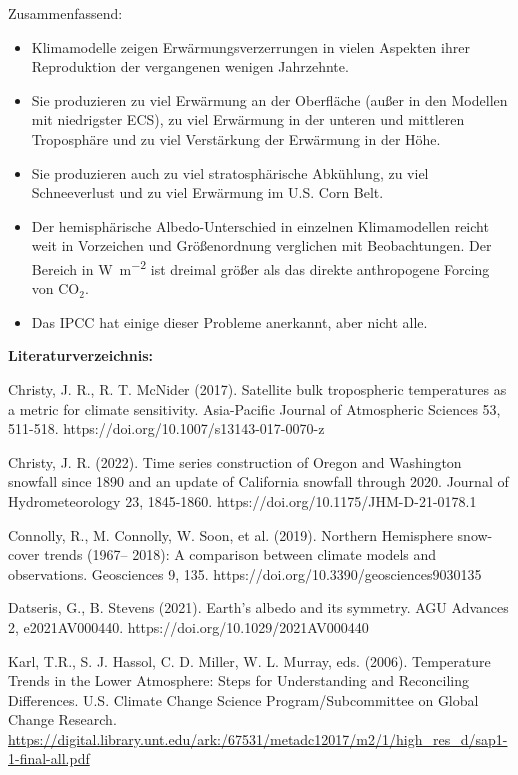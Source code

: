 \documentclass[12pt,paper=a4,DIV=12,parskip=never,chapterprefix=false,headings=standardclasses]{scrreprt}
\begin{document}
Zusammenfassend:
\begin{itemize}
\item Klimamodelle zeigen Erwärmungsverzerrungen in vielen Aspekten ihrer Reproduktion der vergangenen wenigen Jahrzehnte.
\item  Sie produzieren zu viel Erwärmung an der Oberfläche (außer in den Modellen mit niedrigster ECS), zu viel Erwärmung in der unteren und mittleren Troposphäre und zu viel Verstärkung der Erwärmung in der Höhe.
\item  Sie produzieren auch zu viel stratosphärische Abkühlung, zu viel Schneeverlust und zu viel Erwärmung im U.S. Corn Belt.
\item  Der hemisphärische Albedo-Unterschied in einzelnen Klimamodellen reicht weit in Vorzeichen und Größenordnung verglichen mit Beobachtungen. Der Bereich in \si{\watt\per\square\meter} ist dreimal größer als das direkte anthropogene Forcing von CO$_2$.
\item  Das IPCC hat einige dieser Probleme anerkannt, aber nicht alle.
\end{itemize}

\vfill
\noindent\textbf{Literaturverzeichnis:}

\begingroup
\parindent=0pt
\everypar{\hangindent=2em\hangafter=1\relax}

Christy, J. R., R. T. McNider (2017). Satellite bulk tropospheric temperatures as a metric for climate
sensitivity. Asia-Pacific Journal of Atmospheric Sciences 53, 511-518.
https://doi.org/10.1007/s13143-017-0070-z

Christy, J. R. (2022). Time series construction of Oregon and Washington snowfall since 1890 and an
update of California snowfall through 2020. Journal of Hydrometeorology 23, 1845-1860.
https://doi.org/10.1175/JHM-D-21-0178.1

Connolly, R., M. Connolly, W. Soon, et al. (2019). Northern Hemisphere snow-cover trends (1967–
2018): A comparison between climate models and observations. Geosciences 9, 135.
https://doi.org/10.3390/geosciences9030135

Datseris, G., B. Stevens (2021). Earth’s albedo and its symmetry. AGU Advances 2,
e2021AV000440. https://doi.org/10.1029/2021AV000440

Karl, T.R., S. J. Hassol, C. D. Miller, W. L. Murray, eds. (2006). Temperature Trends in the Lower
Atmosphere: Steps for Understanding and Reconciling Differences. U.S. Climate Change Science
Program/Subcommittee on Global Change Research.
\url{https://digital.library.unt.edu/ark:/67531/metadc12017/m2/1/high_res_d/sap1-1-final-all.pdf}
\end{document}

